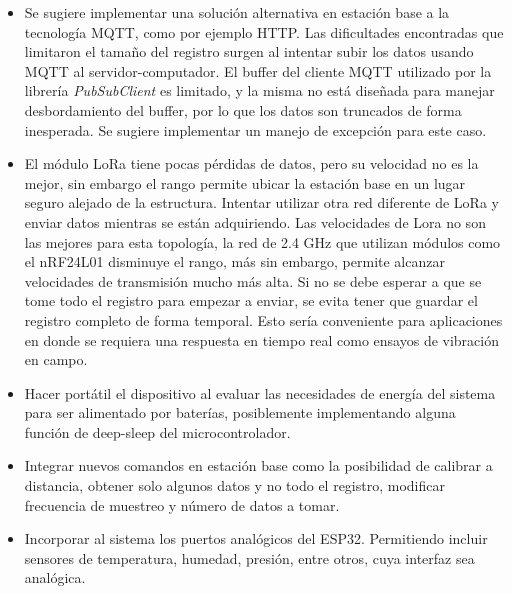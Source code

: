 \begin{itemize}
    
 
 \item Se sugiere implementar una solución alternativa en estación base a la tecnología MQTT, como por ejemplo HTTP. Las dificultades encontradas que limitaron el tamaño del registro surgen al intentar subir los datos usando MQTT al servidor-computador. El buffer del cliente MQTT utilizado por la librería \textit{PubSubClient} es limitado, y la misma no está diseñada para manejar desbordamiento del buffer, por lo que los datos son truncados de forma inesperada. Se sugiere implementar un manejo de excepción para este caso. 
 
 
 \item El módulo LoRa tiene pocas pérdidas de datos, pero su velocidad no es la mejor, sin embargo el rango permite ubicar la estación base en un lugar seguro alejado de la estructura. Intentar utilizar otra red diferente de LoRa y enviar datos mientras se están adquiriendo. Las velocidades de Lora no son las mejores para esta topología, la red de 2.4 GHz que utilizan módulos como el nRF24L01 disminuye el rango, más sin embargo, permite alcanzar velocidades de transmisión mucho más alta. Si no se debe esperar a que se tome todo el registro para empezar a enviar, se evita tener que guardar el registro completo de forma temporal. Esto sería conveniente para aplicaciones en donde se requiera una respuesta en tiempo real como ensayos de vibración en campo.
 
 \item Hacer portátil el dispositivo al evaluar las necesidades de energía del sistema para ser alimentado por baterías, posiblemente implementando alguna función de deep-sleep del microcontrolador.
 
 \item Integrar nuevos comandos en estación base como la posibilidad de calibrar a distancia, obtener solo algunos datos y no todo el registro, modificar frecuencia de muestreo y número de datos a tomar.
 
 \item Incorporar al sistema los puertos analógicos del ESP32. Permitiendo incluir sensores de temperatura, humedad, presión, entre otros, cuya interfaz sea analógica.
 

\end{itemize}
